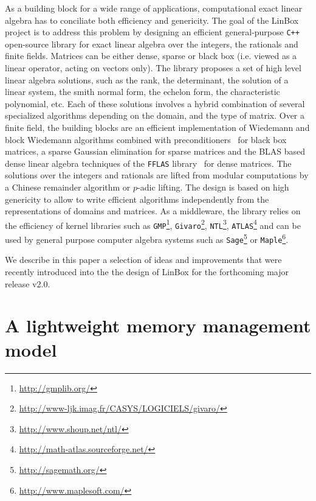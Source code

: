 \documentclass[runningheads,a4paper]{llncs}
\newcommand{\linbox}{{\sc LinBox}\xspace}
\begin{document}
As a building block for a wide range of applications, computational exact linear
algebra has to conciliate both efficiency and genericity. The goal of the 
\linbox project is to address this problem by designing an efficient general-purpose
\texttt{C++} open-source library for exact linear algebra over the integers, the
rationals and finite fields. 
Matrices can be either dense, sparse or black box (i.e. viewed as a linear
operator, acting on vectors only). The library proposes a set of high level
linear algebra solutions, such as the rank, the determinant, the solution of a
linear system, the smith normal form, the echelon form, the characteristic
polynomial, etc. Each of these solutions involves a hybrid combination of several specialized
algorithms depending on the domain, and the type of matrix. Over a finite field,
the building blocks are an efficient implementation of Wiedemann and block
Wiedemann algorithms combined with preconditioners~\cite{CEKSTV:2002:EP} for
black box matrices, a sparse Gaussian elimination for sparse matrices and the
BLAS based dense linear algebra techniques of the \texttt{FFLAS}
library~\cite{DGP:2008:dlaff} for dense matrices. The solutions over the integers
and rationals are lifted from modular computations by a Chinese remainder
algorithm or $p$-adic lifting.
The design is based on high genericity to allow to write efficient algorithms independently from the
representations of domains and matrices. As a middleware, the library relies on the
efficiency of kernel libraries such as  \texttt{GMP}\footnote{\url{http://gmplib.org/}},
\texttt{Givaro}\footnote{\url{http://www-ljk.imag.fr/CASYS/LOGICIELS/givaro/}},
\texttt{NTL}\footnote{\url{http://www.shoup.net/ntl/}},
\texttt{ATLAS}\footnote{\url{http://math-atlas.sourceforge.net/}} and can be used by general
purpose computer algebra systems such as \texttt{Sage}\footnote{\url{http://sagemath.org/}} or \texttt{Maple}\footnote{\url{http://www.maplesoft.com/}}. 

We describe in this paper a selection of ideas and
improvements that were recently introduced into the the design of LinBox 
for the forthcoming major release v2.0.

\section{A lightweight memory management model}

\end{document}

